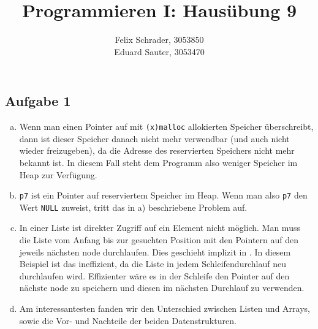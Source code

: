 \documentclass[11pt]{article}
\author{Felix Schrader, 3053850 \\
      Eduard Sauter, 3053470 }
\title{Programmieren I: Haus\"ubung 9}
\date{}
\begin{document}
\maketitle
\subsection*{Aufgabe 1}
\begin{enumerate}[a)]
  \item Wenn man einen Pointer auf mit \texttt{(x)malloc} allokierten Speicher
    überschreibt, dann ist dieser Speicher danach nicht mehr verwendbar (und
    auch nicht wieder freizugeben), da die Adresse des reservierten Speichers
    nicht mehr bekannt ist. In diesem Fall steht dem Programm also weniger
    Speicher im Heap zur Verfügung.
  
  \item \texttt{p7} ist ein Pointer auf reserviertem Speicher im Heap. Wenn man
    also \texttt{p7} den Wert \texttt{NULL} zuweist, tritt das in a)
    beschriebene Problem auf.
  
  \item In einer Liste ist direkter Zugriff auf ein Element nicht möglich. Man
    muss die Liste vom Anfang bis zur gesuchten Position mit den Pointern auf
    den jeweils nächsten node durchlaufen. Dies geschieht implizit in
    \texttt{}. In diesem Beispiel ist das ineffizient, da die
    Liste in jedem Schleifendurchlauf neu durchlaufen wird. Effizienter wäre es
    in der Schleife den Pointer auf den nächste node zu speichern und diesen im
    nächsten Durchlauf zu verwenden.
  
  \item Am interessantesten fanden wir den Unterschied zwischen Listen und
    Arrays, sowie die Vor- und Nachteile der beiden Datenstrukturen.
    
\end{enumerate} 
\end{document}
